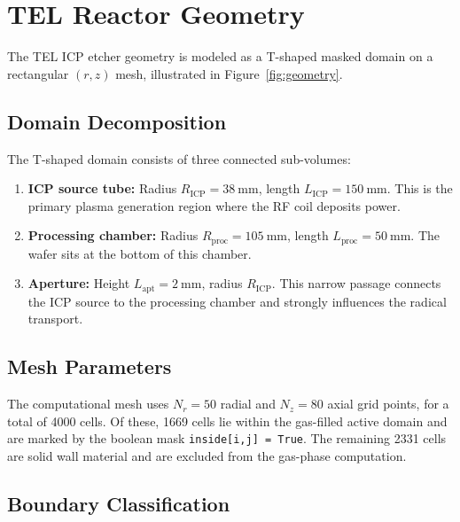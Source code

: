 \documentclass[11pt,a4paper]{report}
\begin{document}
\section{TEL Reactor Geometry}
\label{sec:tel-geometry}

The TEL ICP etcher geometry is modeled as a T-shaped masked domain on a rectangular $(r, z)$ mesh, illustrated in Figure~\ref{fig:geometry}.

\subsection{Domain Decomposition}

The T-shaped domain consists of three connected sub-volumes:
\begin{enumerate}
  \item \textbf{ICP source tube:} Radius $R_\mathrm{ICP} = \SI{38}{\milli\meter}$, length $L_\mathrm{ICP} = \SI{150}{\milli\meter}$.  This is the primary plasma generation region where the RF coil deposits power.
  \item \textbf{Processing chamber:} Radius $R_\mathrm{proc} = \SI{105}{\milli\meter}$, length $L_\mathrm{proc} = \SI{50}{\milli\meter}$.  The wafer sits at the bottom of this chamber.
  \item \textbf{Aperture:} Height $L_\mathrm{apt} = \SI{2}{\milli\meter}$, radius $R_\mathrm{ICP}$.  This narrow passage connects the ICP source to the processing chamber and strongly influences the radical transport.
\end{enumerate}

\subsection{Mesh Parameters}

The computational mesh uses $N_r = 50$ radial and $N_z = 80$ axial grid points, for a total of 4000 cells.  Of these, 1669 cells lie within the gas-filled active domain and are marked by the boolean mask \texttt{inside[i,j] = True}.  The remaining 2331 cells are solid wall material and are excluded from the gas-phase computation.

\subsection{Boundary Classification}
\end{document}
